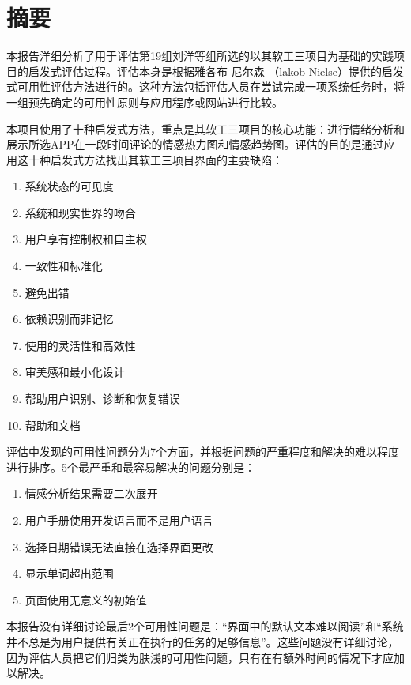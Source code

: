 \section{摘要}
本报告洋细分析了用于评估第19组刘洋等组所选的以其软工三项目为基础的实践项目的启发式评估过程。评估本身是根据雅各布-尼尔森 （lakob Nielse）提供的启发式可用性评估方法进行的。这种方法包括评估人员在尝试完成一项系统任务时，将一组预先确定的可用性原则与应用程序或网站进行比较。

本项目使用了十种启发式方法，重点是其软工三项目的核心功能：进行情绪分析和展示所选APP在一段时间评论的情感热力图和情感趋势图。评估的目的是通过应用这十种启发式方法找出其软工三项目界面的主要缺陷：

\begin{spacing}{1.3}
\vspace{-0.5em}
\begin{multicols}{2}
    \begin{enumerate}[label=\arabic*.]
        \item 系统状态的可见度
        \item 系统和现实世界的吻合
        \item 用户享有控制权和自主权
        \item 一致性和标准化
        \item 避免出错
        \item 依赖识别而非记忆
        \item 使用的灵活性和高效性
        \item 审美感和最小化设计
        \item 帮助用户识别、诊断和恢复错误 
        \item 帮助和文档
    \end{enumerate}
\end{multicols}
\vspace{-0.5em}
\end{spacing}

评估中发现的可用性问题分为7个方面，并根据问题的严重程度和解决的难以程度进行排序。5个最严重和最容易解决的问题分别是：

\begin{enumerate}[label=\arabic*.]
    \item 情感分析结果需要二次展开
    \item 用户手册使用开发语言而不是用户语言
    \item 选择日期错误无法直接在选择界面更改
    \item 显示单词超出范围
    \item 页面使用无意义的初始值
\end{enumerate}

本报告没有详细讨论最后2个可用性问题是：“界面中的默认文本难以阅读”和“系统井不总是为用户提供有关正在执行的任务的足够信息”。这些问题没有详细讨论，因为评估人员把它们归类为肤浅的可用性问题，只有在有额外时间的情况下才应加以解决。